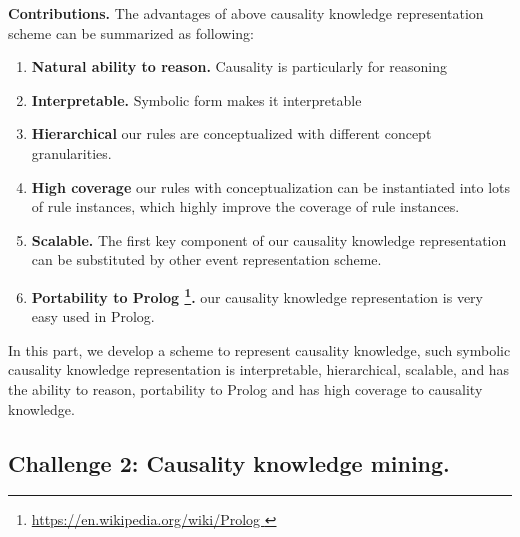 \textbf{Contributions.}
The advantages of above causality knowledge representation scheme can be summarized as following:
\begin{enumerate}
	\item \textbf{Natural ability to reason.} Causality is particularly for reasoning
	\item \textbf{Interpretable.} Symbolic form makes it interpretable
	\item \textbf{Hierarchical} our rules are conceptualized with different concept granularities.
	\item \textbf{High coverage} our rules with conceptualization can be instantiated into lots of rule instances, which highly improve the coverage of rule instances.
	\item \textbf{Scalable.} The first key component of our causality knowledge representation can be substituted by other event representation scheme.
	\item \textbf{Portability to Prolog \footnote{ \url{ https://en.wikipedia.org/wiki/Prolog }}.} our causality knowledge representation is very easy used in Prolog.
\end{enumerate} 

In this part, we develop a scheme to represent causality knowledge,
such symbolic causality knowledge representation is interpretable, hierarchical, scalable, and has the ability to reason, portability to Prolog and has high coverage to causality knowledge.

\subsection{Challenge 2: Causality knowledge mining.}
%
%
%		

